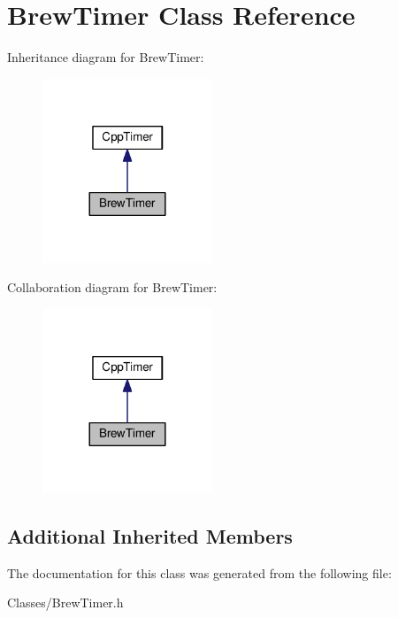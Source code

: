 \hypertarget{classBrewTimer}{}\section{Brew\+Timer Class Reference}
\label{classBrewTimer}


Inheritance diagram for Brew\+Timer\+:\nopagebreak
\begin{figure}[H]
\begin{center}
\leavevmode
\includegraphics[width=144pt]{classBrewTimer__inherit__graph}
\end{center}
\end{figure}


Collaboration diagram for Brew\+Timer\+:\nopagebreak
\begin{figure}[H]
\begin{center}
\leavevmode
\includegraphics[width=144pt]{classBrewTimer__coll__graph}
\end{center}
\end{figure}
\subsection*{Additional Inherited Members}


The documentation for this class was generated from the following file\+:\begin{DoxyCompactItemize}
\item 
Classes/Brew\+Timer.\+h\end{DoxyCompactItemize}
